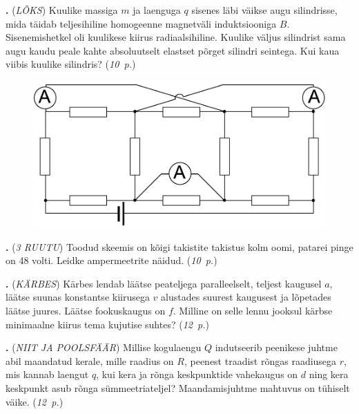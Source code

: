 \documentclass[12pt,a5paper]{article}
\newcommand{\numb}[1]{\vspace{5pt}\textbf{\large #1}}
\newcommand{\nimi}[1]{(\textsl{\small #1})}
\newcommand{\punktid}[1]{(\emph{#1~p.})}
\newcounter{ylesanne}
\newcommand{\yl}[1]{\addtocounter{ylesanne}{1}\numb{\theylesanne.} \nimi{#1} \newblock{}}
\begin{document}
\yl{LÕKS} Kuulike massiga $m$ ja laenguga $q$ sisenes läbi väikse augu silindrisse, mida täidab teljesihiline homogeenne magnetväli induktsiooniga $B$. Sisenemishetkel oli kuulikese kiirus radiaalsihiline. Kuulike väljus silindrist sama augu kaudu peale kahte absoluutselt elastset põrget silindri seintega. Kui kaua viibis kuulike silindris? \punktid{10}

\vspace{-5pt}

\begin{figure}
  \vspace{-15pt}
  \begin{center}
  \includegraphics[scale=0.65]{3ruutu}
  \end{center}
  \vspace{-20pt}
\end{figure}

\newpage

\yl{3 RUUTU} Toodud skeemis on kõigi takistite takistus kolm oomi, patarei pinge on 48 volti. Leidke ampermeetrite näidud. \punktid{10}

\vspace{25pt}


\yl{KÄRBES} Kärbes lendab läätse peateljega paralleelselt, teljest kaugusel $a$, läätse suunas konstantse kiirusega $v$ alustades suurest kaugusest ja lõpetades läätse juures. Läätse fookuskaugus on $f$. Milline on selle lennu jooksul kärbse minimaalne kiirus tema kujutise suhtes? \punktid{12}

\yl{NIIT JA POOLSFÄÄR} Millise kogulaengu $Q$ indutseerib peenikese juhtme abil maandatud kerale, mille raadius on $R$, peenest traadist rõngas raadiusega $r$, mis kannab laengut $q$, kui kera ja rõnga keskpunktide vahekaugus on $d$ ning kera keskpunkt asub rõnga sümmeetriateljel? Maandamisjuhtme mahtuvus on tühiselt väike. \punktid{12}
\end{document}
